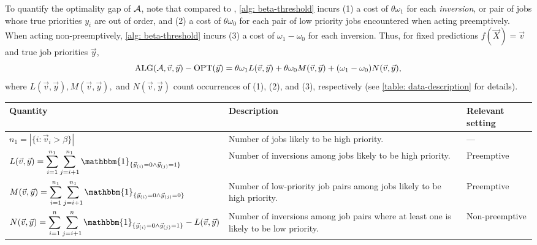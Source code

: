 To quantify the optimality gap of $\mathcal{A}$, \citet{Cho22:Scheduling} note that compared to \OPT, \cref{alg: beta-threshold} incurs (1) a cost of $\theta \omega_1$ for each \textit{inversion}, or pair of jobs whose true priorities $y_i$ are out of order, and (2) a cost of $\theta \omega_0$ for each pair of low priority jobs encountered when acting preemptively. When acting non-preemptively, \cref{alg: beta-threshold} incurs (3) a cost of $\omega_1 - \omega_0$ for each inversion. Thus, for fixed predictions $f(\vec{X}) = \vec{v}$ and true job priorities $\vec{y}$,
 \begin{equation}\label{eq:scheduling_CR}
    \textnormal{ALG}(\mathcal{A}, \vec{v}, \vec{y}) - \textnormal{OPT}(\vec{y}) = \theta\omega_1 L(\vec{v}, \vec{y}) + \theta\omega_0  M(\vec{v}, \vec{y}) + (\omega_1 - \omega_0)  N(\vec{v}, \vec{y}),
 \end{equation}
 where $L(\vec{v}, \vec{y}), M(\vec{v}, \vec{y}),$ and $N(\vec{v}, \vec{y})$ count occurrences of (1), (2), and (3), respectively (see \cref{table: data-description} for details).
\begin{table*}[!tb] 
\centering
\small
    \caption{Quantities of interest in prediction-aided scheduling for fixed predictions $f(\vec{X})=\vec{v}$ and job priorities $\vec{y}$.}
    \label{table: data-description}
\begin{tabular}{lp{5.5cm}l}
\toprule
\textbf{Quantity}  & \textbf{Description} &\textbf{Relevant setting} \\
\midrule
$n_1 = |\{i: \vec{v}_i > \beta\}|$ & Number of jobs likely to be high priority. & ---\\
$L(\vec{v}, \vec{y}) = \displaystyle\sum_{i=1}^{n_1} \sum_{j = i+1}^{n_1} \mathbbm{1}_{\{\vec{y}_{(i)} = 0 \land \vec{y}_{(j)} = 1\}}$ & Number of inversions among jobs likely to be high priority. & Preemptive \\
$M(\vec{v}, \vec{y}) = \displaystyle\sum_{i=1}^{n_1} \sum_{j = i+1}^{n_1} \mathbbm{1}_{\{\vec{y}_{(i)} = 0 \land \vec{y}_{(j)} = 0\}}$ & Number of low-priority job pairs among jobs likely to be high priority. & Preemptive\\
$N(\vec{v}, \vec{y}) = \displaystyle\sum_{i=1}^{n} \sum_{j = i+1}^{n}  \mathbbm{1}_{\{\vec{y}_{(i)} = 0 \land \vec{y}_{(j)} = 1\}} - L(\vec{v}, \vec{y})$ & Number of inversions among job pairs where at least one is likely to be low priority. & Non-preemptive\\

\bottomrule
\end{tabular}
\end{table*}

